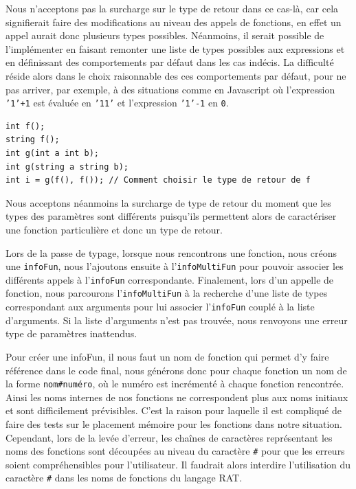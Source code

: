 \documentclass[11pt,a4paper]{article}
\begin{document}
Nous n'acceptons pas la surcharge sur le type de retour dans ce cas-là, car cela signifierait faire des modifications au niveau des appels de fonctions, en effet un appel aurait donc plusieurs types possibles. Néanmoins, il serait possible de l'implémenter en faisant remonter une liste de types possibles aux expressions et en définissant des comportements par défaut dans les cas indécis. La difficulté réside alors dans le choix raisonnable des ces comportements par défaut, pour ne pas arriver, par exemple, à des situations comme en Javascript où l'expression \texttt{'1'+1} est évaluée en \texttt{'11'} et l'expression \texttt{'1'-1} en \texttt{0}.

\begin{verbatim}
int f();
string f();
int g(int a int b);
int g(string a string b); 
int i = g(f(), f()); // Comment choisir le type de retour de f
\end{verbatim}

Nous acceptons néanmoins la surcharge de type de retour du moment que les types des paramètres sont différents puisqu'ils permettent alors de caractériser une fonction particulière et donc un type de retour.

Lors de la passe de typage, lorsque nous rencontrons une fonction, nous créons une \texttt{infoFun}, nous l'ajoutons ensuite à l'\texttt{infoMultiFun} pour pouvoir associer les différents appels à l'\texttt{infoFun} correspondante. Finalement, lors d'un appelle de fonction, nous parcourons l'\texttt{infoMultiFun} à la recherche d'une liste de types correspondant aux arguments pour lui associer l'\texttt{infoFun} couplé à la liste d'arguments. Si la liste d'arguments n'est pas trouvée, nous renvoyons une erreur type de paramètres inattendus.

Pour créer une infoFun, il nous faut un nom de fonction qui permet d'y faire référence dans le code final, nous générons donc pour chaque fonction un nom de la forme \texttt{nom\#numéro}, où le numéro est incrémenté à chaque fonction rencontrée. Ainsi les noms internes de nos fonctions ne correspondent plus aux noms initiaux et sont difficilement prévisibles. C'est la raison pour laquelle il est compliqué de faire des tests sur le placement mémoire pour les fonctions dans notre situation. Cependant, lors de la levée d'erreur, les chaînes de caractères représentant les noms des fonctions sont découpées au niveau du caractère \texttt{\#} pour que les erreurs soient compréhensibles pour l'utilisateur. Il faudrait alors interdire l'utilisation du caractère \texttt{\#} dans les noms de fonctions du langage RAT.
\end{document}
